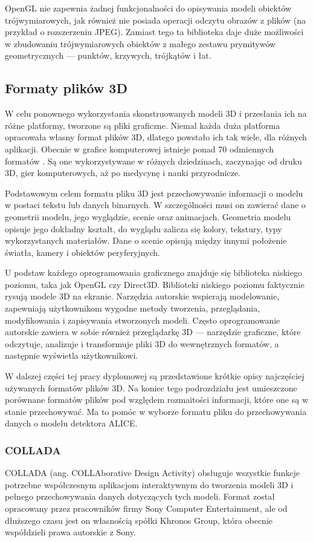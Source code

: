 OpenGL nie zapewnia żadnej funkcjonalności do opisywania modeli obiektów trójwymiarowych, jak również nie posiada operacji odczytu obrazów z plików (na przykład o rozszerzeniu JPEG). Zamiast tego ta biblioteka daje duże możliwości w zbudowaniu trójwymiarowych obiektów z małego zestawu prymitywów geometrycznych --- punktów, krzywych, trójkątów i łat.

\subsection{Formaty plików 3D}
W celu ponownego wykorzystania skonstruowanych modeli 3D i przesłania ich na różne platformy, tworzone są pliki graficzne. Niemal każda duża platforma opracowała własny format plików 3D, dlatego powstało ich tak wiele, dla różnych aplikacji. Obecnie w grafice komputerowej istnieje ponad 70 odmiennych formatów \cite{formatslist}. Są one wykorzystywane w różnych dziedzinach, zaczynając od druku 3D, gier komputerowych, aż po medycynę i nauki przyrodnicze.

Podstawowym celem formatu pliku 3D jest przechowywanie informacji o modelu w postaci tekstu lub danych binarnych. W szczególności musi on zawierać dane o geometrii modelu, jego wyglądzie, scenie oraz animacjach. Geometria modelu opisuje jego dokładny kształt, do wyglądu zalicza się kolory, tekstury, typy wykorzystanych materiałów. Dane o scenie opisują między innymi położenie światła, kamery i obiektów peryferyjnych.

U podstaw każdego oprogramowania graficznego znajduje się biblioteka niskiego poziomu, taka jak OpenGL czy Direct3D. Biblioteki niskiego poziomu faktycznie rysują modele 3D na ekranie. Narzędzia autorskie wspierają modelowanie, zapewniają użytkownikom wygodne metody tworzenia, przeglądania, modyfikowania i zapisywania stworzonych modeli. Często oprogramowanie autorskie zawiera w sobie również przeglądarkę 3D --- narzędzie graficzne, które odczytuje, analizuje i transformuje pliki 3D do wewnętrznych formatów, a następnie wyświetla użytkownikowi.

W dalszej części tej pracy dyplomowej są przedstawione krótkie opisy najczęściej używanych formatów plików 3D. Na koniec tego podrozdziału jest umieszczone porównane formatów plików pod względem rozmaitości informacji, które one są w stanie przechowywać. Ma to pomóc w wyborze formatu pliku do przechowywania danych o modelu detektora ALICE.

\subsubsection{COLLADA}
COLLADA (ang. COLLAborative Design Activity) obsługuje wszystkie funkcje potrzebne współczesnym aplikacjom interaktywnym do tworzenia modeli 3D i pełnego przechowywania danych dotyczących tych modeli. Format został opracowany przez pracowników firmy Sony Computer Entertainment, ale od dłuższego czasu jest on własnością spółki Khronos Group, która obecnie współdzieli prawa autorskie z Sony. 


